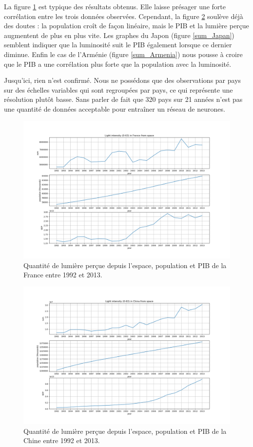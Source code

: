 \documentclass[a4paper, 11pt]{report}
\begin{document}
La figure \ref{sum_France} est typique des résultats obtenus. Elle laisse présager une forte corrélation entre les trois données observées. Cependant, la figure \ref{sum_China} soulève déjà des doutes : la population croît de façon linéaire, mais le PIB et la lumière perçue augmentent de plus en plus vite. Les graphes du Japon (figure \ref{sum_Japan}) semblent indiquer que la luminosité suit le PIB également lorsque ce dernier diminue. Enfin le cas de l'Arménie (figure \ref{sum_Armenia}) nous pousse à croire que le PIB a une corrélation plus forte que la population avec la luminosité.

Jusqu'ici, rien n'est confirmé. Nous ne possédons que des observations par pays sur des échelles variables qui sont regroupées par pays, ce qui représente une résolution plutôt basse. Sans parler de fait que 320 pays sur 21 années n'est pas une quantité de données acceptable pour entraîner un réseau de neurones.

\begin{figure}
	\centering
	\includegraphics[width=1.0\textwidth]{img/sum_France.png}
	\caption{Quantité de lumière perçue depuis l'espace, population et PIB de la France entre 1992 et 2013.}
	\label{sum_France}
\end{figure}

\begin{figure}
	\centering
	\includegraphics[width=1.0\textwidth]{img/sum_China.png}
	\caption{Quantité de lumière perçue depuis l'espace, population et PIB de la Chine entre 1992 et 2013.}
	\label{sum_China}
\end{figure}
\end{document}
